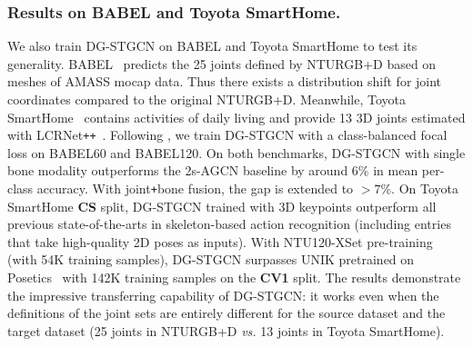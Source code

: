 \vspace{-1mm}
\subsubsection{Results on BABEL and Toyota SmartHome. }
We also train DG-STGCN on BABEL and Toyota SmartHome to test its generality.
BABEL~\cite{punnakkal2021babel} predicts the 25 joints defined by NTURGB+D based on meshes of AMASS mocap data. 
Thus there exists a distribution shift for joint coordinates compared to the original NTURGB+D. 
Meanwhile, Toyota SmartHome~\cite{Das_2019_ICCV} contains activities of daily living and provide 13 3D joints estimated with LCRNet\texttt{++}~\cite{rogez2019lcr}. 
Following \cite{punnakkal2021babel}, we train DG-STGCN with a class-balanced focal loss on BABEL60 and BABEL120. 
On both benchmarks, DG-STGCN with single bone modality outperforms the 2s-AGCN baseline by around 6\% in mean per-class accuracy. 
With joint\texttt{+}bone fusion, the gap is extended to $>7$\%.
On Toyota SmartHome \textbf{CS} split, DG-STGCN trained with 3D keypoints outperform all previous state-of-the-arts 
in skeleton-based action recognition (including entries that take high-quality 2D poses as inputs).
With NTU120-XSet pre-training (with 54K training samples), 
DG-STGCN surpasses UNIK pretrained on Posetics~\cite{yang2021unikau} with 142K training samples on the \textbf{CV1} split. 
The results demonstrate the impressive transferring capability of DG-STGCN:
it works even when the definitions of the joint sets are entirely different for the source dataset and the target dataset 
(25 joints in NTURGB+D \emph{vs.} 13 joints in Toyota SmartHome). 
